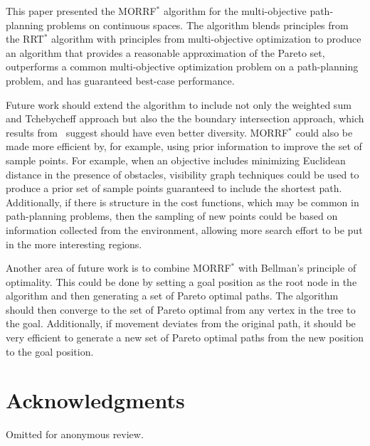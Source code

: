 \documentclass{article}
\begin{document}
This paper presented the MORRF$^{*}$ algorithm for the multi-objective path-planning problems on continuous spaces.
The algorithm blends principles from the RRT$^{*}$ algorithm with principles from multi-objective optimization to produce an algorithm that provides a reasonable approximation of the Pareto set, outperforms a common multi-objective optimization problem on a path-planning problem, and has guaranteed best-case performance.

Future work should extend the algorithm to include not only the weighted sum and Tchebycheff approach but also the the boundary intersection approach, which results from~\cite{4358754} suggest should have even better diversity.
MORRF$^{*}$ could also be made more efficient by, for example, using prior information to improve the set of sample points.
For example, when an objective includes minimizing Euclidean distance in the presence of obstacles, visibility graph techniques could be used to produce a prior set of sample points guaranteed to include the shortest path.
Additionally, if there is structure in the cost functions, which may be common in path-planning problems, then the sampling of new points could be based on information collected from the environment, allowing more search effort to be put in the more interesting regions.

Another area of future work is to combine MORRF$^{*}$ with Bellman's principle of optimality.
This could be done by setting a goal position as the root node in the algorithm and then generating a set of Pareto optimal paths.
The algorithm should then converge to the set of Pareto optimal from any vertex in the tree to the goal.
Additionally, if movement deviates from the original path, it should be very efficient to generate a new set of Pareto optimal paths from the new position to the goal position.

\section*{Acknowledgments}
Omitted for anonymous review.



\end{document}
